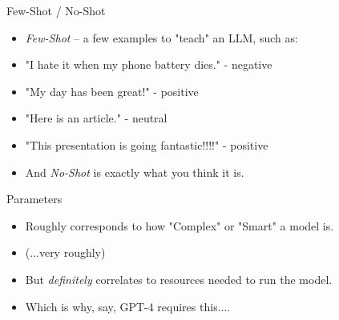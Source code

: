 \documentclass{beamer}
\begin{document}

\begin{frame}[plain]
\end{frame}

\begin{frame}{Few-Shot / No-Shot}
	\begin{itemize}
		\item \textit{Few-Shot} -- a few examples to "teach" an LLM, such as:
		\pause
		\item "I hate it when my phone battery dies." - negative
		\pause
		\item "My day has been great!" - positive
		\pause
		\item "Here is an article." - neutral
		\pause
		\item "This presentation is going fantastic!!!!" - positive
		\pause
		\item And \textit{No-Shot} is exactly what you think it is.
	\end{itemize}
\end{frame}


\begin{frame}{Parameters}
	\begin{itemize}
		\item Roughly corresponds to how "Complex" or "Smart" a model is.
		\pause
		\item (...very roughly)
		\pause 
		\item But \textit{definitely} correlates to resources needed to run the model.
		\pause
		\item Which is why, say, GPT-4 requires this....
	\end{itemize}
\end{frame}
\end{document}

